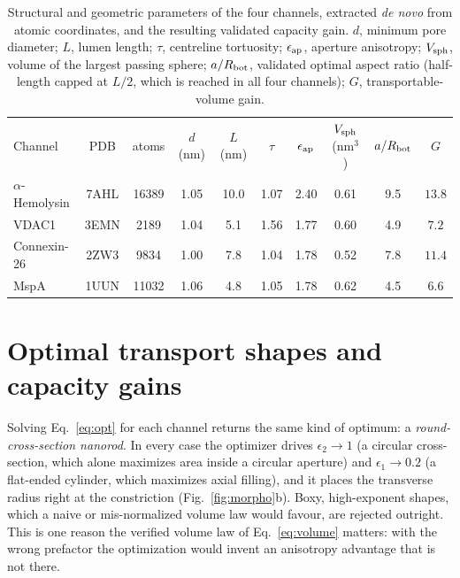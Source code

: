 \documentclass[aps,pre,twocolumn,superscriptaddress,floatfix,nofootinbib]{revtex4-2}
\begin{document}
\begin{table}[t]
\caption{Structural and geometric parameters of the four channels, extracted
\emph{de novo} from atomic coordinates, and the resulting validated capacity
gain. $d$, minimum pore diameter; $L$, lumen length; $\tau$, centreline
tortuosity; $\epsilon_{\rm ap}$, aperture anisotropy; $V_{\rm sph}$, volume of
the largest passing sphere; $a/R_{\rm bot}$, validated optimal aspect ratio
(half-length capped at $L/2$, which is reached in all four channels);
$G$, transportable-volume gain.}
\label{tab:channels}
\begin{ruledtabular}
\begin{tabular}{lccccccccc}
Channel & PDB & atoms & $d$ (nm) & $L$ (nm) & $\tau$ & $\epsilon_{\rm ap}$
 & $V_{\rm sph}$ (nm$^3$) & $a/R_{\rm bot}$ & $G$ \\
\colrule
$\alpha$-Hemolysin & 7AHL & 16389 & 1.05 & 10.0 & 1.07 & 2.40 & 0.61 & 9.5 & $\mathbf{13.8}$ \\
VDAC1              & 3EMN & 2189  & 1.04 & 5.1  & 1.56 & 1.77 & 0.60 & 4.9 & $\mathbf{7.2}$ \\
Connexin-26        & 2ZW3 & 9834  & 1.00 & 7.8  & 1.04 & 1.78 & 0.52 & 7.8 & $\mathbf{11.4}$ \\
MspA               & 1UUN & 11032 & 1.06 & 4.8  & 1.05 & 1.78 & 0.62 & 4.5 & $\mathbf{6.6}$ \\
\end{tabular}
\end{ruledtabular}
\end{table}

\section{Optimal transport shapes and capacity gains}

Solving Eq.~\eqref{eq:opt} for each channel returns the same kind of optimum: a
\emph{round-cross-section nanorod}. In every case the optimizer drives
$\epsilon_2\to 1$ (a circular cross-section, which alone maximizes area inside a
circular aperture) and $\epsilon_1\to 0.2$ (a flat-ended cylinder, which
maximizes axial filling), and it places the transverse radius right at the
constriction (Fig.~\ref{fig:morpho}b). Boxy, high-exponent shapes, which a naive
or mis-normalized volume law would favour, are rejected outright. This is one
reason the verified volume law of Eq.~\eqref{eq:volume} matters: with the wrong
prefactor the optimization would invent an anisotropy advantage that is not
there.
\end{document}
